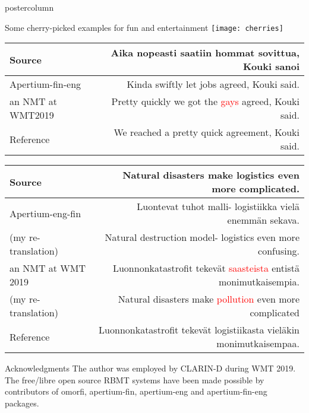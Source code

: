 \documentclass[final,hyperref={pdfpagelabels}]{beamer}
\begin{document}
\begin{frame}
\begin{columns}
\begin{column}{.49\textwidth}
\begin{beamercolorbox}[center,wd=\textwidth]{postercolumn}
\begin{minipage}[T]{.95\textwidth}
{        \begin{block}{Some cherry-picked examples for fun and entertainment}
            \texttt{[image: cherries]} \\
            \begin{tabular}{lr}
                \toprule
                Source & Aika nopeasti saatiin hommat sovittua, Kouki sanoi \\
                \midrule
                Apertium-fin-eng & Kinda swiftly let jobs agreed, Kouki said. \\
                an NMT at WMT2019 & Pretty quickly we got the
                \textcolor{red}{gays} agreed, Kouki said.\\
                \midrule
                Reference & We reached a pretty quick agreement, Kouki said.\\
                \bottomrule
            \end{tabular}
            \small
            \begin{tabular}{lr}
                \toprule
                Source & Natural disasters make logistics even more complicated.
                \\
                \midrule
                Apertium-eng-fin & Luontevat tuhot malli- logistiikka vielä
                enemmän sekava.  \\
                (my re-translation) & Natural destruction model- logistics even
                more confusing. \\
                an NMT at WMT 2019 & Luonnonkatastrofit tekevät
                \textcolor{red}{saasteista} entistä monimutkaisempia.\\
                (my re-translation) &  Natural disasters make
                \textcolor{red}{pollution} even more complicated \\
                \midrule
                Reference & Luonnonkatastrofit tekevät
                logistiikasta vieläkin monimutkaisempaa. \\
                \bottomrule
            \end{tabular}
        \end{block}

        \begin{block}{Acknowledgments}
            The author was employed by CLARIN-D during WMT 2019. The free/libre
            open source RBMT systems have been made possible by contributors of
            omorfi, apertium-fin, apertium-eng and apertium-fin-eng packages.


\end{block}}
\end{minipage}
\end{beamercolorbox}
\end{column}
\end{columns}
\end{frame}
\end{document}
